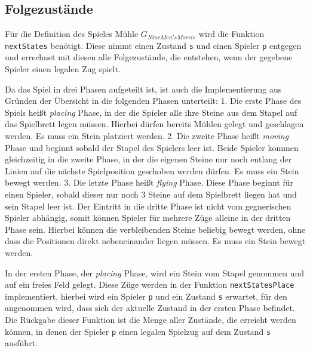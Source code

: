 \documentclass[11pt]{article}
\begin{document}
    \hypertarget{folgezustuxe4nde}{%
\subsection{Folgezustände}\label{folgezustuxe4nde}}

Für die Definition des Spieles Mühle \(G_{Nine Men's Morris}\) wird die
Funktion \texttt{nextStates} benötigt. Diese nimmt einen Zustand
\texttt{s} und einen Spieler \texttt{p} entgegen und errechnet mit
diesen alle Folgezustände, die entstehen, wenn der gegebene Spieler
einen legalen Zug spielt.

Da das Spiel in drei Phasen aufgeteilt ist, ist auch die Implementierung
aus Gründen der Übersicht in die folgenden Phasen unterteilt: 1. Die
erste Phase des Spiels heißt \emph{placing} Phase, in der die Spieler
alle ihre Steine aus dem Stapel auf das Spielbrett legen müssen. Hierbei
dürfen bereits Mühlen gelegt und geschlagen werden. Es muss ein Stein
platziert werden. 2. Die zweite Phase heißt \emph{moving} Phase und
beginnt sobald der Stapel des Spielers leer ist. Beide Spieler kommen
gleichzeitig in die zweite Phase, in der die eigenen Steine nur noch
entlang der Linien auf die nächste Spielposition geschoben werden
dürfen. Es muss ein Stein bewegt werden. 3. Die letzte Phase heißt
\emph{flying} Phase. Diese Phase beginnt für einen Spieler, sobald
dieser nur noch \(3\) Steine auf dem Spielbrett liegen hat und sein
Stapel leer ist. Der Eintritt in die dritte Phase ist nicht vom
gegnerischen Spieler abhängig, somit können Spieler für mehrere Züge
alleine in der dritten Phase sein. Hierbei können die verbleibenden
Steine beliebig bewegt werden, ohne dass die Positionen direkt
nebeneinander liegen müssen. Es muss ein Stein bewegt werden.

In der ersten Phase, der \emph{placing} Phase, wird ein Stein vom Stapel
genommen und auf ein freies Feld gelegt. Diese Züge werden in der
Funktion \texttt{nextStatesPlace} implementiert, hierbei wird ein
Spieler \texttt{p} und ein Zustand \texttt{s} erwartet, für den
angenommen wird, dass sich der aktuelle Zustand in der ersten Phase
befindet. Die Rückgabe dieser Funktion ist die Menge aller Zustände, die
erreicht werden können, in denen der Spieler \texttt{p} einen legalen
Spielzug auf dem Zustand \texttt{s} ausführt.
\end{document}

